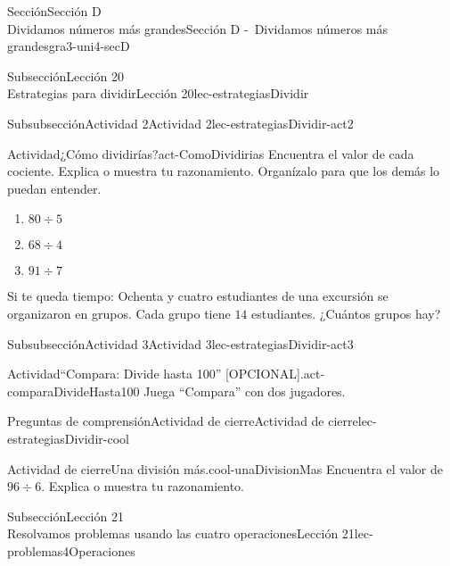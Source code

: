 \begin{sectionptx}{Sección}{{\Large Sección D\\}Dividamos números más grandes}{}{Sección D -~Dividamos números más grandes}{}{}{gra3-uni4-secD}
\begin{subsectionptx}{Subsección}{{\normalsize Lección 20\\[-0.05cm]}Estrategias para dividir}{}{Lección 20}{}{}{lec-estrategiasDividir}
%
\clearpage
\begin{subsubsectionptx}{Subsubsección}{Actividad 2}{}{Actividad 2}{}{}{lec-estrategiasDividir-act2}
\begin{activity}{Actividad}{¿Cómo dividirías?}{act-ComoDividirias}%
Encuentra el valor de cada cociente. Explica o muestra tu razonamiento. Organízalo para que los demás lo puedan entender.%
%
\begin{enumerate}
\item{}\(\displaystyle 80\div 5\)%
\item{}\(\displaystyle 68\div 4\)%
\item{}\(\displaystyle 91\div 7\)%
\end{enumerate}
Si te queda tiempo: Ochenta y cuatro estudiantes de una excursión se organizaron en grupos. Cada grupo tiene \(14\) estudiantes. ¿Cuántos grupos hay?%
\end{activity}%
\end{subsubsectionptx}
%
%
\typeout{************************************************}
\typeout{************************************************}
%
\begin{subsubsectionptx}{Subsubsección}{Actividad 3}{}{Actividad 3}{}{}{lec-estrategiasDividir-act3}
\begin{activity}{Actividad}{“Compara: Divide hasta 100” [OPCIONAL].}{act-comparaDivideHasta100}%
Juega ``Compara'' con dos jugadores.%
\end{activity}%
\end{subsubsectionptx}
%
%
\typeout{************************************************}
\typeout{************************************************}
%
\begin{reading-questions-subsubsection}{Preguntas de comprensión}{Actividad de cierre}{}{Actividad de cierre}{}{}{lec-estrategiasDividir-cool}
\begin{project}{Actividad de cierre}{Una división más.}{cool-unaDivisionMas}%
Encuentra el valor de \(96 \div 6\). Explica o muestra tu razonamiento.%
\end{project}%
\end{reading-questions-subsubsection}
\end{subsectionptx}
%
%
\typeout{************************************************}
\typeout{************************************************}
%
\begin{subsectionptx}{Subsección}{{\normalsize Lección 21\\[-0.05cm]}Resolvamos problemas usando las cuatro operaciones}{}{Lección 21}{}{}{lec-problemas4Operaciones}

\end{subsectionptx}
\end{sectionptx}
